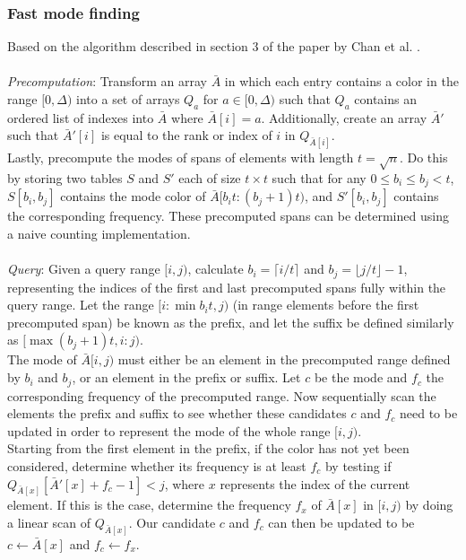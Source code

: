 \documentclass{article}
\begin{document}
\subsubsection{Fast mode finding}
Based on the algorithm described in section 3 of the paper by Chan et al. \cite{Chan2014}. \\\\
\textit{Precomputation}: Transform an array $\bar{A}$ in which each entry contains a color in the range $[0, \Delta)$ into a set of arrays $Q_a$ for $a \in [0, \Delta)$ such that $Q_a$ contains an ordered list of indexes into $\bar{A}$ where $\bar{A}[i] = a$. Additionally, create an array $\bar{A}'$ such that $\bar{A}'[i]$ is equal to the rank or index of $i$ in $Q_{\bar{A}[i]}$. \\
Lastly, precompute the modes of spans of elements with length $t = \sqrt{n}$. Do this by storing two tables $S$ and $S'$ each of size $t \times t$ such that for any $0\leq b_i \leq b_j < t$, $S[b_i, b_j]$ contains the mode color of $\bar{A}[b_it : (b_j + 1)t)$, and $S'[b_i, b_j]$ contains the corresponding frequency. These precomputed spans can be determined using a naive counting implementation. \\\\
\textit{Query}: Given a query range $[i, j)$, calculate $b_i=\lceil i/t \rceil$ and $b_j=\lfloor j/t \rfloor - 1$, representing the indices of the first and last precomputed spans fully within the query range. Let the range $[i : \min{b_it, j})$ (in range elements before the first precomputed span) be known as the prefix, and let the suffix be defined similarly as $[\max{(b_j + 1)t, i} : j)$. \\
The mode of $\bar{A}[i, j)$ must either be an element in the precomputed range defined by $b_i$ and $b_j$, or an element in the prefix or suffix. Let $c$ be the mode and $f_c$ the corresponding frequency of the precomputed range. Now sequentially scan the elements the prefix and suffix to see whether these candidates $c$ and $f_c$ need to be updated in order to represent the mode of the whole range $[i, j)$. \\
Starting from the first element in the prefix, if the color has not yet been considered, determine whether its frequency is at least $f_c$ by testing if $Q_{\bar{A}[x]}[\bar{A}'[x] + f_c - 1] < j$, where $x$ represents the index of the current element. If this is the case, determine the frequency $f_x$ of $\bar{A}[x]$ in $[i, j)$ by doing a linear scan of $Q_{\bar{A}[x]}$. Our candidate $c$ and $f_c$ can then be updated to be $c \leftarrow \bar{A}[x]$ and $f_c \leftarrow f_x$. 
\end{document}
